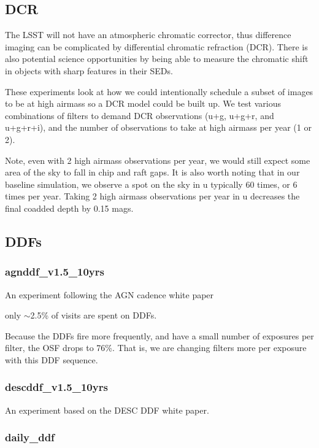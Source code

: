 \subsection{DCR}

The LSST will not have an atmospheric chromatic corrector, thus difference imaging can be complicated by differential chromatic refraction (DCR). There is also potential science opportunities by being able to measure the chromatic shift in objects with sharp features in their SEDs.

These experiments look at how we could intentionally schedule a subset of images to be at high airmass so a DCR model could be built up. We test various combinations of filters to demand DCR observations (u+g, u+g+r, and u+g+r+i), and the number of observations to take at high airmass per year (1 or 2). 

Note, even with 2 high airmass observations per year, we would still expect some area of the sky to fall in chip and raft gaps.  It is also worth noting that in our baseline simulation, we observe a spot on the sky in u typically 60 times, or 6 times per year. Taking 2 high airmass observations per year in u decreases the final coadded depth by 0.15 mags.

   
\subsection{DDFs}
\subsubsection{agnddf\_v1.5\_10yrs}

An experiment following the AGN cadence white paper

only $\sim$2.5\% of visits are spent on DDFs. 

Because the DDFs fire more frequently, and have a small number of exposures per filter, the OSF drops to 76\%. That is, we are changing filters more per exposure with this DDF sequence. 

\subsubsection{descddf\_v1.5\_10yrs}

An experiment based on the DESC DDF white paper.

\subsubsection{daily\_ddf}

